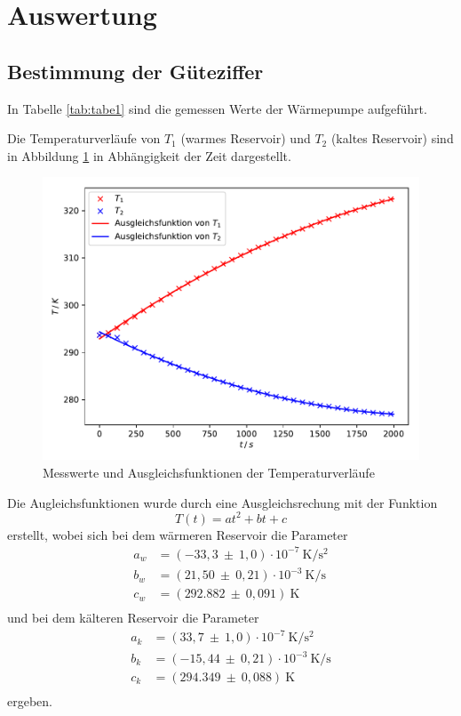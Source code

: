 \section{Auswertung}
\label{sec:Auswertung}
\subsection{Bestimmung der Güteziffer}
In Tabelle \ref{tab:tabe1} sind die gemessen Werte der Wärmepumpe aufgeführt.

\noindent Die Temperaturverläufe von $ T_1 $ (warmes Reservoir) und $ T_2 $ (kaltes
Reservoir) sind in Abbildung \ref{fig:plot1} in Abhängigkeit der Zeit dargestellt.
\begin{figure}[H]
  \centering
  \includegraphics{plot1.pdf}
  \caption{Messwerte und Ausgleichsfunktionen der Temperaturverläufe}
  \label{fig:plot1}
\end{figure}
Die Augleichsfunktionen wurde durch eine Ausgleichsrechung mit der Funktion
\begin{equation}
  T(t) = at^2 +bt +c
\end{equation}
erstellt, wobei sich bei dem wärmeren Reservoir die Parameter
\begin{align*}
  a_w &= (-33,3 \: \pm \: 1,0) \cdot 10^{-7} \: \si{\kelvin\per\second\squared}\\
  b_w &= (21,50 \: \pm \: 0,21) \cdot 10^{-3} \: \si{\kelvin\per\second}\\
  c_w &= (292.882 \: \pm \: 0,091) \: \si{\kelvin} \\
\end{align*}
und bei dem kälteren Reservoir die Parameter
\begin{align*}
  a_k &= (33,7 \: \pm \: 1,0) \cdot 10^{-7} \: \si{\kelvin\per\second\squared}\\
  b_k &= (-15,44 \: \pm \: 0,21) \cdot 10^{-3} \: \si{\kelvin\per\second}\\
  c_k &= (294.349 \: \pm \: 0,088) \: \si{\kelvin}\\
\end{align*}
ergeben.

